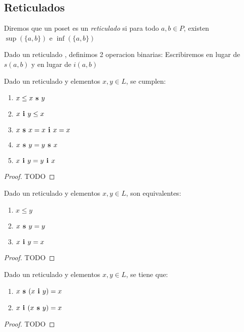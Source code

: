 \subsection{Reticulados}
\begin{definition}
  Diremos que un poset \poset es un \emph{reticulado} si para todo $a, b \in P$, existen $\sup(\{a, b\})$ e $\inf(\{a, b\})$
\end{definition}

\begin{definition}
  Dado un reticulado \poset, definimos 2 operacion binarias:
Escribiremos  en lugar de $s(a, b)$ y  en lugar de $i(a, b)$
\end{definition}

\begin{lemma}
  Dado un reticulado \reticul y elementos $x, y \in L$, se cumplen:
  \begin{enumerate}
    \item $x \leq x\textbf{ s }y$
    \item $x\textbf{ i }y \leq x$
    \item $x\textbf{ s }x = x\textbf{ i }x = x$
    \item $x\textbf{ s }y = y\textbf{ s }x$
    \item $x\textbf{ i }y = y\textbf{ i }x$ 
  \end{enumerate}
\end{lemma}
\begin{proof}
  TODO
\end{proof}

\begin{lemma}
  Dado un reticulado \reticul y elementos $x, y \in L$, son equivalentes:
  \begin{enumerate}
    \item $x \leq y$
    \item $x\textbf{ s }y = y$
    \item $x\textbf{ i }y = x$
  \end{enumerate}
\end{lemma}
\begin{proof}
  TODO
\end{proof}

\begin{lemma}
  Dado un reticulado \reticul y elementos $x, y \in L$, se tiene que:
  \begin{enumerate}
    \item $x\textbf{ s }(x\textbf{ i }y) = x$
    \item $x\textbf{ i }(x\textbf{ s }y) = x$
  \end{enumerate}
\end{lemma}
\begin{proof}
  TODO
\end{proof}

